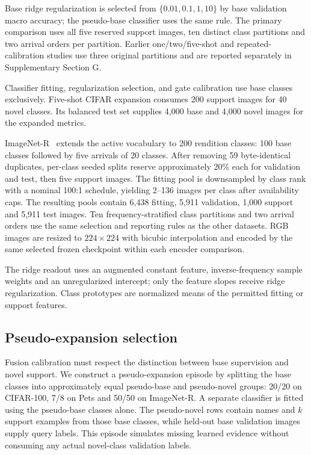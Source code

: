 \documentclass[preprint,review,12pt]{elsarticle}
\begin{document}
Base ridge regularization is selected from $\{0.01,0.1,1,10\}$ by base validation macro accuracy; the pseudo-base classifier uses the same rule. The primary comparison uses all five reserved support images, ten distinct class partitions and two arrival orders per partition. Earlier one/two/five-shot and repeated-calibration studies use three original partitions and are reported separately in Supplementary Section G.

Classifier fitting, regularization selection, and gate calibration use base classes exclusively. Five-shot CIFAR expansion consumes 200 support images for 40 novel classes. Its balanced test set supplies 4,000 base and 4,000 novel images for the expanded metrics.

ImageNet-R~\cite{hendrycks2021manyfaces} extends the active vocabulary to 200 rendition classes: 100 base classes followed by five arrivals of 20 classes. After removing 59 byte-identical duplicates, per-class seeded splits reserve approximately 20\% each for validation and test, then five support images. The fitting pool is downsampled by class rank with a nominal 100:1 schedule, yielding 2--136 images per class after availability caps. The resulting pools contain 6,438 fitting, 5,911 validation, 1,000 support and 5,911 test images. Ten frequency-stratified class partitions and two arrival orders use the same selection and reporting rules as the other datasets. RGB images are resized to $224\times224$ with bicubic interpolation and encoded by the same selected frozen checkpoint within each encoder comparison.

The ridge readout uses an augmented constant feature, inverse-frequency sample weights and an unregularized intercept; only the feature slopes receive ridge regularization. Class prototypes are normalized means of the permitted fitting or support features.

\subsection{Pseudo-expansion selection}
Fusion calibration must respect the distinction between base supervision and novel support. We construct a pseudo-expansion episode by splitting the base classes into approximately equal pseudo-base and pseudo-novel groups: 20/20 on CIFAR-100, 7/8 on Pets and 50/50 on ImageNet-R. A separate classifier is fitted using the pseudo-base classes alone. The pseudo-novel rows contain names and $k$ support examples from those base classes, while held-out base validation images supply query labels. This episode simulates missing learned evidence without consuming any actual novel-class validation labels.
\end{document}
